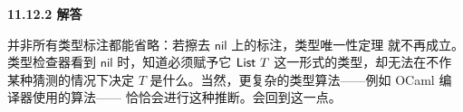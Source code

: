 \begin{taplauthorsolutionentrybox}
\label{sol:author:11.12.2}
\textbf{11.12.2 解答}

并非所有类型标注都能省略：若擦去 \(\mathsf{nil}\) 上的标注，类型唯一性定理
就不再成立。类型检查器看到 \(\mathsf{nil}\) 时，知道必须赋予它
\(\mathsf{List}\ T\) 这一形式的类型，却无法在不作某种猜测的情况下决定
\(T\) 是什么。当然，更复杂的类型算法——例如 OCaml 编译器使用的算法——
恰恰会进行这种推断。会回到这一点。

\end{taplauthorsolutionentrybox}
